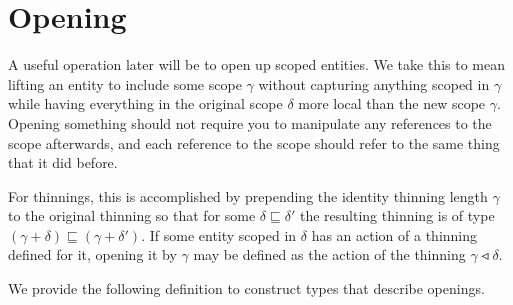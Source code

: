 \section{Opening}
\label{sec:Opening}



A useful operation later will be to open up scoped entities. We take this
to mean lifting an entity to include some scope $γ$ without capturing
anything scoped in $γ$ while having everything in the original scope $δ$
more local than the new scope $γ$. Opening something should not require you
to manipulate any references to the scope afterwards, and each reference to
the scope should refer to the same thing that it did before.

For thinnings, this is accomplished by prepending the identity thinning
length $γ$ to the original thinning so that for some $δ ⊑ δ'$ the resulting
thinning is of type $(γ + δ) ⊑ (γ + δ')$. If some entity scoped in $δ$ has an
action of a thinning defined for it, opening it by $γ$ may be defined as the
action of the thinning $γ ◃ δ$.

We provide the following definition to construct types that describe openings.

